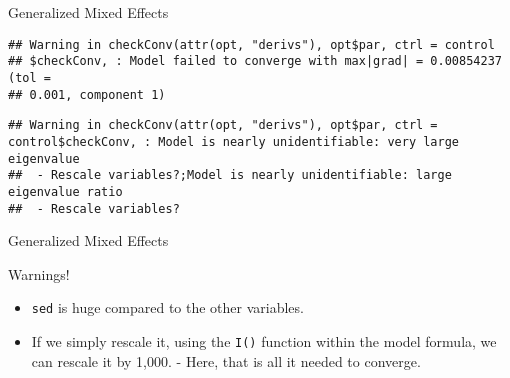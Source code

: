 \begin{frame}[fragile]{Generalized Mixed Effects}

\footnotesize

\begin{Shaded}
\begin{Highlighting}[]
\StringTok{ }\OperatorTok{~}\StringTok{ }\OperatorTok{+}\StringTok{ }\OperatorTok{+}\StringTok{ }\OperatorTok{+}\StringTok{ }\OperatorTok{+}\StringTok{ }\NormalTok{(} \OperatorTok{|}\StringTok{ }
                  \NormalTok{)}
\end{Highlighting}
\end{Shaded}

\begin{verbatim}
## Warning in checkConv(attr(opt, "derivs"), opt$par, ctrl = control
## $checkConv, : Model failed to converge with max|grad| = 0.00854237 (tol =
## 0.001, component 1)
\end{verbatim}

\begin{verbatim}
## Warning in checkConv(attr(opt, "derivs"), opt$par, ctrl = control$checkConv, : Model is nearly unidentifiable: very large eigenvalue
##  - Rescale variables?;Model is nearly unidentifiable: large eigenvalue ratio
##  - Rescale variables?
\end{verbatim}

\end{frame}

\begin{frame}[fragile]{Generalized Mixed Effects}

\begin{block}{Warnings!}

\begin{itemize}
\tightlist
\item
  \texttt{sed} is huge compared to the other variables.
\item
  If we simply rescale it, using the \texttt{I()} function within the
  model formula, we can rescale it by 1,000. - Here, that is all it
  needed to converge.
\end{itemize}

\end{block}

\end{frame}

